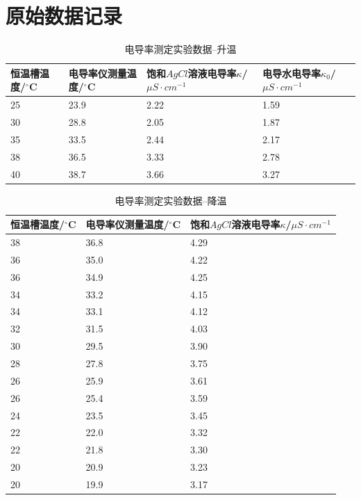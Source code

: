 \documentclass[a4paper]{article}
\begin{document}
\section*{原始数据记录}
\begin{table}[H]
	\caption{电导率测定实验数据--升温}
	\begin{center}
		\begin{tabular}{llll}
			\hline
			恒温槽温度/$^\circ$C	&电导率仪测量温度/$^\circ$C 	&饱和$AgCl$溶液电导率$\kappa$/$\mu S\cdot cm^{-1}$& 电导水电导率$\kappa_{0}$/$\mu S\cdot cm^{-1}$\\
			\hline
			25&23.9&2.22&1.59\\

			30&28.8&2.05&1.87\\

			35&33.5&2.44&2.17\\

			38&36.5&3.33&2.78\\

			40&38.7&3.66&3.27\\
			\hline
		 \end{tabular}
	\end{center}
\end{table}
\begin{table}[H]
	\caption{电导率测定实验数据--降温}
	\begin{center}
		\begin{tabular}{lll}
			\hline
			恒温槽温度/$^\circ$C	&电导率仪测量温度/$^\circ$C 	&饱和$AgCl$溶液电导率$\kappa$/$\mu S\cdot cm^{-1}$\\
			\hline
			38&36.8&4.29\\
			36&35.0&4.22\\
			36&34.9&4.25\\
			34&33.2&4.15\\
			34&33.1&4.12\\
			32&31.5&4.03\\
			30&29.5&3.90\\
			28&27.8&3.75\\
			26&25.9&3.61\\
			26&25.4&3.59\\
			24&23.5&3.45\\
			22&22.0&3.32\\
			22&21.8&3.30\\
			20&20.9&3.23\\
			20&19.9&3.17\\
			\hline
		 \end{tabular}
	\end{center}
\end{table}
\end{document}
